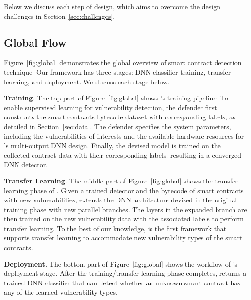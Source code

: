 Below we discuss each step of \sys{} design, which aims to overcome the design challenges in Section~\ref{sec:challenges}. 

\vspace{-0.3em}
\subsection{\sys{} Global Flow} \label{sec:global}

Figure~\ref{fig:global} demonstrates the global overview of \sys{} smart contract detection technique. Our framework has three stages: DNN classifier training, transfer learning, and deployment. We discuss each stage below.

\vspace{0.05em}
\textbf{Training.} The top part of Figure~\ref{fig:global} shows \sys{}'s training pipeline. 
To enable supervised learning for vulnerability detection, the defender first constructs the smart contracts bytecode dataset with corresponding labels, as detailed in Section~\ref{sec:data}.
The defender specifies the system parameters, including the vulnerabilities of interests and the available hardware resources for \sys{}'s multi-output DNN design.  
Finally, the devised model is trained on the collected contract data with their corresponding labels, resulting in a converged DNN detector.   

\vspace{0.05em}

\textbf{Transfer Learning.} The middle part of Figure~\ref{fig:global} shows the transfer learning phase of \sys{}. 
Given a trained detector and the bytecode of smart contracts with new vulnerabilities, \sys{} extends the DNN architecture devised in the original training phase with new parallel branches. 
The layers in the expanded branch are then trained on the new vulnerability data with the associated labels to perform transfer learning. 
To the best of our knowledge, \sys{} is the first framework that supports transfer learning to accommodate new vulnerability types of the smart contracts. 

\vspace{0.05em}
\textbf{Deployment.} The bottom part of Figure~\ref{fig:global} shows the workflow of \sys{}'s deployment stage. 
After the training/transfer learning phase completes, \sys{} returns a trained DNN classifier that can detect whether an unknown smart contract has any of the learned vulnerability types.  

\vspace{-0.6em}
